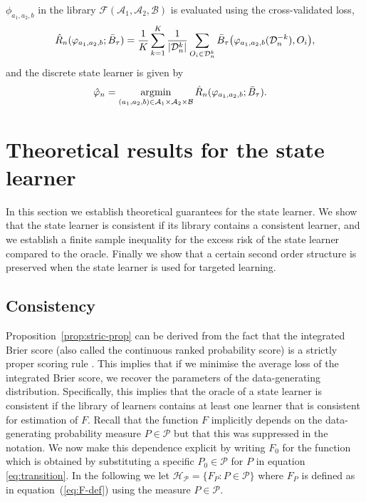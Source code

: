 \( \phi_{a_1, a_2, b} \) in the library
\( \mathcal{F}(\mathcal{A}_1, \mathcal{A}_2, \mathcal{B}) \) is
evaluated using the cross-validated loss,
\begin{equation*}
  \hat{R}_{n}(\varphi_{a_1,a_2,b} ; \bar{B}_{\tau}) =
  \frac{1}{K}\sum_{k=1}^{K}
  \frac{1}{| \mathcal{D}_n^{k} |}\sum_{O_i \in \mathcal{D}_n^{k}}
  \bar B_\tau
  {
    \left(
      \varphi_{a_1,a_2,b}{ (\ensuremath{\mathcal{D}}_n^{-k})}
      , O_i
    \right)
  },
\end{equation*}
and the discrete state learner is given by
\begin{align*}\label{eq:discrete-state-learner}
  \hat{\varphi}_n
  &=  \operatorname*{\arg\!\min}_{(a_1,a_2,b)\in \mathcal{A}_1\times\mathcal{A}_2\times\mathcal{B}}
    \hat{R}_{n}(\varphi_{a_1,a_2,b} ; \bar{B}_{\tau}).
\end{align*}


\section{Theoretical results for the state learner}
\label{sec:theor-results-prop}

In this section we establish theoretical guarantees for the state learner. We
show that the state learner is consistent if its library contains a consistent
learner, and we establish a finite sample inequality for the excess risk of the
state learner compared to the oracle. Finally we show that a certain second
order structure is preserved when the state learner is used for targeted
learning.

\subsection{Consistency}
\label{sec:consistency}

Proposition~\ref{prop:stric-prop} can be derived from the fact that the
integrated Brier score (also called the continuous ranked probability score) is
a strictly proper scoring rule \citep{gneiting2007strictly}. This implies that
if we minimise the average loss of the integrated Brier score, we recover the
parameters of the data-generating distribution. Specifically, this implies that
the oracle of a state learner is consistent if the library of learners contains
at least one learner that is consistent for estimation of \( F \). Recall that
the function \(F\) implicitly depends on the data-generating probability measure
\(P\in\mathcal P\) but that this was suppressed in the notation. We now make
this dependence explicit by writing \(F_0\) for the function which is obtained
by substituting a specific \(P_0\in\mathcal{P}\) for \(P\) in equation
\eqref{eq:transition}. In the following we let
\( \mathcal{H}_{\mathcal{P}} = \{F_P : P \in \mathcal{P}\} \) where \( F_P \) is defined as in
equation~(\ref{eq:F-def}) using the measure \( P \in \mathcal{P} \).

